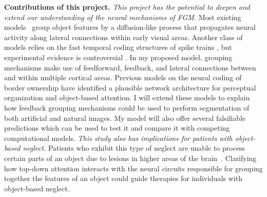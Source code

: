 \documentclass[11pt]{article}
\begin{document}
\textbf{Contributions of this project.}  \textit{This project has the
  potential to deepen and extend our understanding of the neural
  mechanisms of FGM.} 
 Most existing
models~\citep{Grossberg94, Grossberg97, Zhaoping05, Piech_etal13}
group object features by a diffusion-like process that propagates
neural activity along lateral connections within early visual
areas.
Another class of models
relies on the fast temporal
coding structures of spike trains \citep{Singer99b}, but experimental
evidence is controversial \citep{Thiele_Stoner03,Roelfsema_etal04,Dong_etal08a}. 
In my
proposed model,
grouping mechanisms
make use of
feedforward, feedback, and lateral connections between and within
multiple cortical areas. Previous models on the neural coding of
border ownership have identified a plausible network architecture for
perceptual organization and object-based
attention. 
I will extend these models to explain how feedback grouping mechanisms
could be used to perform segmentation of both artificial and natural images. My model will also offer several falsifiable predictions
    which can be used to test it
and compare it with 
competing computational models. \textit{This study also has
implications for patients with object-based neglect.} Patients who
exhibit this type of neglect are unable to process certain parts of an
object due to lesions in higher areas of the
brain~\citep{Marshall_Halligan93}.  Clarifying how top-down attention
interacts with the neural circuits responsible for grouping together
the features of an object could guide therapies for individuals with
object-based neglect.
\end{document}
